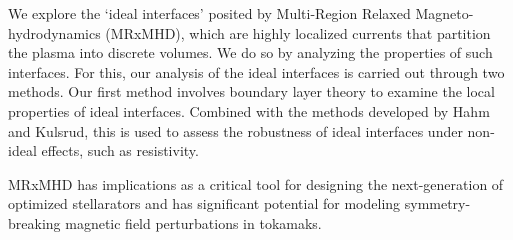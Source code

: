 \documentclass[../main.tex]{subfiles}
\begin{document}
We explore the ‘ideal interfaces’ posited by Multi-Region Relaxed Magneto-hydrodynamics (MRxMHD), which are highly localized currents that partition the plasma into discrete volumes. We do so by analyzing the properties of such interfaces. For this, our analysis of the ideal interfaces is carried out through two methods. Our first method involves boundary layer theory to examine the local properties of ideal interfaces. Combined with the methods developed by Hahm and Kulsrud, this is used to assess the robustness of ideal interfaces under non-ideal effects, such as resistivity.

MRxMHD has implications as a critical tool for designing the next-generation of optimized stellarators and has significant potential for modeling symmetry-breaking magnetic field perturbations in tokamaks.
\end{document}
